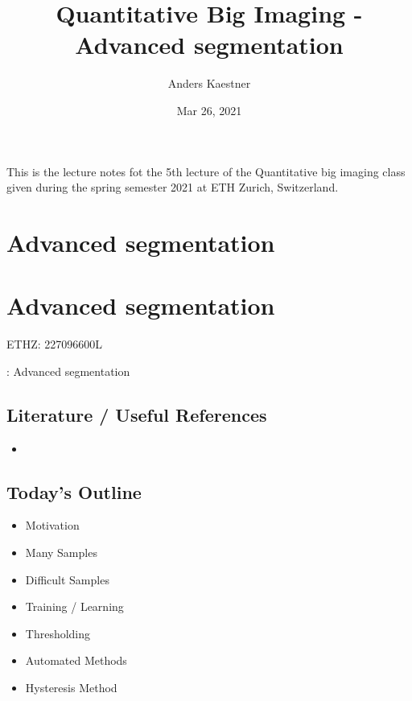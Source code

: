 \documentclass[letterpaper,10pt,english]{sphinxmanual}
\title{Quantitative Big Imaging - Advanced segmentation}
\date{Mar 26, 2021}
\author{Anders Kaestner}
\begin{document}
\pagestyle{empty}
\sphinxmaketitle
\pagestyle{plain}
\sphinxtableofcontents
\pagestyle{normal}
\label{\detokenize{preface::doc}}


\sphinxAtStartPar
This is the lecture notes fot the 5th lecture of the Quantitative big imaging class given during the spring semester 2021 at ETH Zurich, Switzerland.


\chapter{Advanced segmentation}
\label{\detokenize{05-AdvancedSegmentation:advanced-segmentation}}\label{\detokenize{05-AdvancedSegmentation::doc}}

\chapter{Advanced segmentation}
\label{\detokenize{05-AdvancedSegmentation:id1}}


\sphinxAtStartPar
{} ETHZ: 227\sphinxhyphen{}0966\sphinxhyphen{}00L

\sphinxAtStartPar
{}: Advanced segmentation






\section{Literature / Useful References}
\label{\detokenize{05-AdvancedSegmentation:literature-useful-references}}\begin{itemize}
\item {} 
\sphinxAtStartPar
{}

\end{itemize}


\section{Today’s Outline}
\label{\detokenize{05-AdvancedSegmentation:today-s-outline}}\begin{itemize}
\item {} 
\sphinxAtStartPar
Motivation

\item {} 
\sphinxAtStartPar
Many Samples

\item {} 
\sphinxAtStartPar
Difficult Samples

\item {} 
\sphinxAtStartPar
Training / Learning

\item {} 
\sphinxAtStartPar
Thresholding

\item {} 
\sphinxAtStartPar
Automated Methods

\item {} 
\sphinxAtStartPar
Hysteresis Method

\end{itemize}
\end{document}
